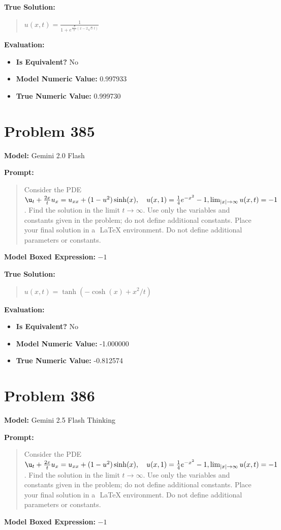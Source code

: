 \documentclass{article}
\begin{document}
{\textbf{True Solution:}
\begin{quote}
$u(x,t) =\frac{1}{1 + e^{\frac{\sqrt{5}}{2}(x - 2\sqrt{5}\, t)}}$
\end{quote}

\textbf{Evaluation:}
\begin{itemize}
\item \textbf{Is Equivalent?} No
\item \textbf{Model Numeric Value:} 0.997933
\item \textbf{True Numeric Value:} 0.999730
\end{itemize}
\vspace{1cm}
\section*{Problem 385}
\textbf{Model:} Gemini 2.0 Flash

\textbf{Prompt:}
\begin{quote}
Consider the PDE $\u_t + \frac{2x}{t} u_x = u_{xx} + (1-u^2) \sinh(x), \quad u(x,1) = \frac{1}{4}e^{-x^2} -1, \lim_{|x| \to \infty} u(x, t) = -1$. Find the solution in the limit $t \to \infty$. Use only the variables and constants given in the problem; do not define additional constants. Place your final solution in a $\boxed{}$ LaTeX environment. Do not define additional parameters or constants.
\end{quote}
\textbf{Model Boxed Expression:} $-1$

\textbf{True Solution:}
\begin{quote}
$u(x,t) = \tanh(-\cosh(x) + x^2/t)$
\end{quote}

\textbf{Evaluation:}
\begin{itemize}
\item \textbf{Is Equivalent?} No
\item \textbf{Model Numeric Value:} -1.000000
\item \textbf{True Numeric Value:} -0.812574
\end{itemize}
\vspace{1cm}
\section*{Problem 386}
\textbf{Model:} Gemini 2.5 Flash Thinking

\textbf{Prompt:}
\begin{quote}
Consider the PDE $\u_t + \frac{2x}{t} u_x = u_{xx} + (1-u^2) \sinh(x), \quad u(x,1) = \frac{1}{4}e^{-x^2} -1, \lim_{|x| \to \infty} u(x, t) = -1$. Find the solution in the limit $t \to \infty$. Use only the variables and constants given in the problem; do not define additional constants. Place your final solution in a $\boxed{}$ LaTeX environment. Do not define additional parameters or constants.
\end{quote}
\textbf{Model Boxed Expression:} $-1$

}
\end{document}
